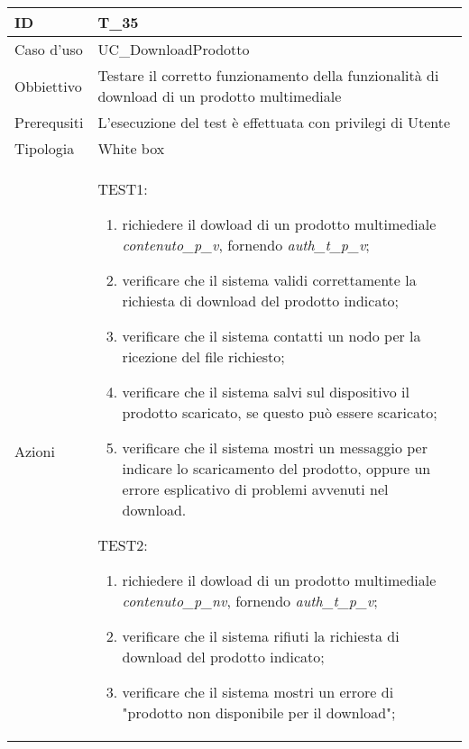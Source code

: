 \begin{table}[hb]
    \centering
    \begin{tabular}{ |p{2cm}|p{10cm}|  }
        \hline
        ID          & T\_35                                                                                        \\\hline
        Caso d'uso  & UC\_DownloadProdotto                                                                         \\\hline
        Obbiettivo  & Testare il corretto funzionamento della funzionalità di download di un prodotto multimediale \\\hline
        Prerequsiti & L'esecuzione del test è effettuata con privilegi di Utente                                   \\\hline
        Tipologia   & White box                                                                                    \\\hline
        Azioni      &
        TEST1:
        \begin{enumerate}[nosep, topsep=0pt]
            \item richiedere il dowload di un prodotto multimediale \emph{contenuto\_p\_v}, fornendo \emph{auth\_t\_p\_v};
            \item verificare che il sistema validi correttamente la richiesta di download del prodotto indicato;
            \item verificare che il sistema contatti un nodo per la ricezione del file richiesto;
            \item verificare che il sistema salvi sul dispositivo il prodotto scaricato, se questo può essere scaricato;
            \item verificare che il sistema mostri un messaggio per indicare lo scaricamento del prodotto, oppure un errore esplicativo di problemi avvenuti nel download.
        \end{enumerate}
        \vspace{0.5cm} TEST2:
        \begin{enumerate}[nosep, topsep=0pt]
            \item richiedere il dowload di un prodotto multimediale \emph{contenuto\_p\_nv}, fornendo \emph{auth\_t\_p\_v};
            \item verificare che il sistema rifiuti la richiesta di download del prodotto indicato;
            \item verificare che il sistema mostri un errore di "prodotto non disponibile per il download";
        \end{enumerate}
        \\\hline
    \end{tabular}
\end{table}

